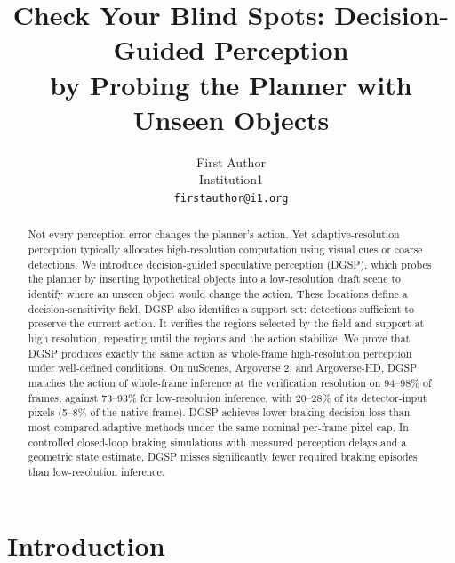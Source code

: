 \documentclass[10pt,twocolumn,letterpaper]{article}
\title{Check Your Blind Spots: Decision-Guided Perception\\by Probing the Planner with Unseen Objects}
\author{First Author\\
Institution1\\
{\tt\small firstauthor@i1.org}
}
\newcommand{\method}{DGSP\xspace}
\theoremstyle{definition}
\theoremstyle{remark}
\begin{document}
\makeatletter{}\makeatother{}  %
\setcounter{dbltopnumber}{1} %
\maketitle

\begin{abstract}
Not every perception error changes the planner's action. Yet adaptive-resolution perception typically allocates high-resolution computation using visual cues or coarse detections.
We introduce decision-guided speculative perception (\method), which probes the planner by inserting hypothetical objects into a low-resolution draft scene to identify where an unseen object would change the action. These locations define a decision-sensitivity field.
\method also identifies a support set: detections sufficient to preserve the current action. It verifies the regions selected by the field and support at high resolution, repeating until the regions and the action stabilize.
We prove that \method produces exactly the same action as whole-frame high-resolution perception under well-defined conditions.
On nuScenes, Argoverse 2, and Argoverse-HD, \method matches the action of whole-frame inference at the verification resolution on 94–98\% of frames, against 73–93\% for low-resolution inference, with 20–28\% of its detector-input pixels (5–8\% of the native frame). \method achieves lower braking decision loss than most compared adaptive methods under the same nominal per-frame pixel cap. In controlled closed-loop braking simulations with measured perception delays and a geometric state estimate, \method misses significantly fewer required braking episodes than low-resolution inference.
\end{abstract}

\section{Introduction}
\label{sec:intro}
\end{document}
